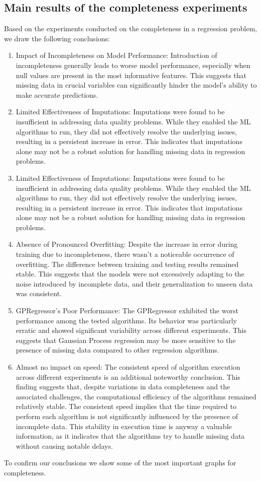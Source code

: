 \documentclass{Configuration_Files/PoliMi3i_thesis}
\begin{document}
\subsection{Main results of the completeness experiments}
\label{subsec:section_4_1_1}%
Based on the experiments conducted on the completeness in a regression problem, we draw the following conclusions:
\begin{enumerate}
    \item Impact of Incompleteness on Model Performance:
        Introduction of incompleteness generally leads to worse model performance, especially when null values are present in the most informative features. This suggests that missing data in crucial variables can significantly hinder the model's ability to make accurate predictions.
    \item Limited Effectiveness of Imputations:
        Imputations were found to be insufficient in addressing data quality problems. While they enabled the ML algorithms to run, they did not effectively resolve the underlying issues, resulting in a persistent increase in error. This indicates that imputations alone may not be a robust solution for handling missing data in regression problems.
    \item Limited Effectiveness of Imputations:
        Imputations were found to be insufficient in addressing data quality problems. While they enabled the ML algorithms to run, they did not effectively resolve the underlying issues, resulting in a persistent increase in error. This indicates that imputations alone may not be a robust solution for handling missing data in regression problems.
    \item Absence of Pronounced Overfitting:
        Despite the increase in error during training due to incompleteness, there wasn't a noticeable occurrence of overfitting. The difference between training and testing results remained stable. This suggests that the models were not excessively adapting to the noise introduced by incomplete data, and their generalization to unseen data was consistent.
    \item GPRegressor's Poor Performance:
        The GPRegressor exhibited the worst performance among the tested algorithms. Its behavior was particularly erratic and showed significant variability across different experiments. This suggests that Gaussian Process regression may be more sensitive to the presence of missing data compared to other regression algorithms.
    \item Almost no impact on speed:
        The consistent speed of algorithm execution across different experiments is an additional noteworthy conclusion. This finding suggests that, despite variations in data completeness and the associated challenges, the computational efficiency of the algorithms remained relatively stable. The consistent speed implies that the time required to perform each algorithm is not significantly influenced by the presence of incomplete data. This stability in execution time is anyway a valuable information, as it indicates that the algorithms try to handle missing data without causing notable delays.
\end{enumerate}
To confirm our conclusions we show some of the most important graphs for completeness.
\end{document}
